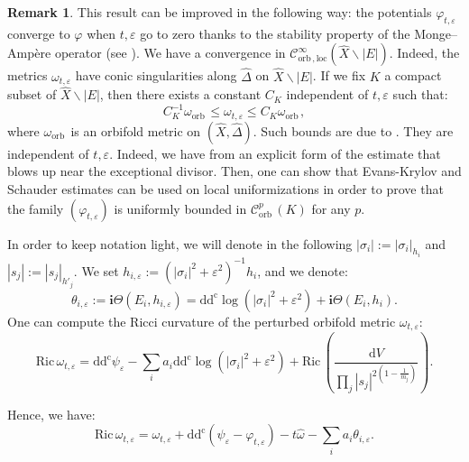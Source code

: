 \documentclass[12pt,a4paper]{amsart}
\newcommand{\orb}{\mathrm{orb}\,}
\newcommand{\ddc}{\mathrm{dd^c}}
\newcommand{\Ric}{\mathrm{Ric}\,}
\theoremstyle{plain}
\theoremstyle{definition}
\newtheorem{rema}[theo]{Remark}
\begin{document}
\begin{rema}\label{convergence local smooth orbifold of potentials}
This result can be improved in the following way: the potentials $\varphi_{t, \varepsilon}$ converge to $\varphi$ when $t, \varepsilon$ go to zero thanks to the stability property of the Monge--Ampère operator (see \cite[Thm.~C]{GZ12}). We have a convergence in $\mathcal{C}^\infty_{\orb, \mathrm{loc}}(\widehat{X} \backslash |E|)$. Indeed, the metrics $\omega_{t, \varepsilon}$ have conic singularities along $\widehat{\Delta}$ on $\widehat{X} \backslash |E|$. If we fix $K $ a compact subset of $\widehat{X} \backslash |E|$, then there exists a constant $C_K$ independent of $t, \varepsilon$ such that:
$$
C_K^{-1} \omega_{\orb} \leq \omega_{t, \varepsilon} \leq C_K \omega_{\orb},
$$
where $\omega_{\orb}$ is an orbifold metric on $(\widehat{X}, \widehat{\Delta})$. 
Such bounds are due to \cite[Thm.~2.(ii)]{GP16}. They are independent of $t, \varepsilon$. Indeed, we have from \cite[Prop.4.1]{Gue13} an explicit form of the estimate that blows up near the exceptional divisor. Then, one can show that Evans-Krylov and Schauder estimates can be used on local uniformizations in order to prove that the family $(\varphi_{t, \varepsilon})$ is uniformly bounded in $\mathcal{C}^p_\orb(K)$ for any $p$.\\
\end{rema}



In order to keep notation light, we will denote in the following $|\sigma_i| := |\sigma_i|_{h_i}$ and $|s_j| := |s_j|_{h'_j}$. We set $h_{i, \varepsilon} := \left( |\sigma_i|^2 + \varepsilon^2 \right)^{-1} h_i$, and we denote: 
$$
\theta_{i,\varepsilon} := \textbf{i}\Theta(E_i, h_{i, \varepsilon}) = \ddc \log \left( |\sigma_i|^2 + \varepsilon^2 \right) + \textbf{i}\Theta(E_i, h_{i}). 
$$
One can compute the Ricci curvature of the perturbed orbifold metric $\omega_{t, \varepsilon}$:
\begin{equation}
    \Ric \omega_{t, \varepsilon} = \ddc \psi_\varepsilon - \sum_i a_i \ddc \log \left( |\sigma_i| ^2 + \varepsilon^2 \right) + \Ric \left( \frac{\mathrm{d}V}{\prod_j |s_j|^{2 \left( 1- \frac{1}{m_j} \right)}} \right).
\end{equation}

Hence, we have:
\begin{equation}\label{Perturbed Ric}
\Ric \omega_{t, \varepsilon} = \omega_{t, \varepsilon} + \ddc (\psi_\varepsilon - \varphi_{t, \varepsilon}) - t\widehat{\omega} - \sum_i a_i \theta_{i, \varepsilon}.
\end{equation}
\end{document}
